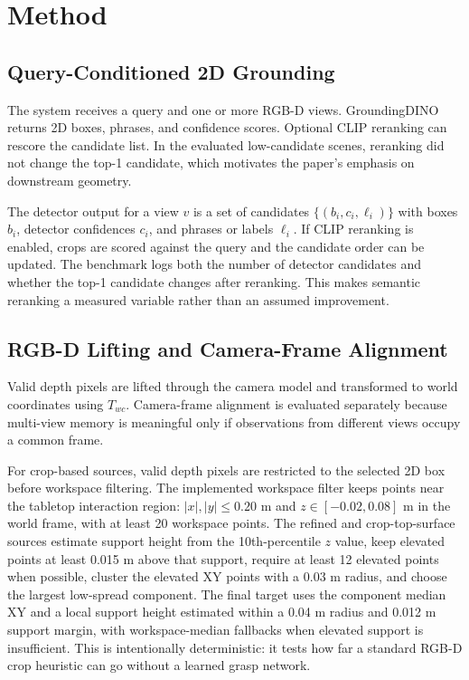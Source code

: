 \documentclass[preprint,12pt]{elsarticle}
\begin{document}
\section{Method}

\subsection{Query-Conditioned 2D Grounding}

The system receives a query and one or more RGB-D views. GroundingDINO returns
2D boxes, phrases, and confidence scores. Optional CLIP reranking can rescore
the candidate list. In the evaluated low-candidate scenes, reranking did not
change the top-1 candidate, which motivates the paper's emphasis on downstream
geometry.

The detector output for a view $v$ is a set of candidates
$\{(b_i, c_i, \ell_i)\}$ with boxes $b_i$, detector confidences $c_i$, and
phrases or labels $\ell_i$. If CLIP reranking is enabled, crops are scored
against the query and the candidate order can be updated. The benchmark logs
both the number of detector candidates and whether the top-1 candidate changes
after reranking. This makes semantic reranking a measured variable rather than
an assumed improvement.

\subsection{RGB-D Lifting and Camera-Frame Alignment}

Valid depth pixels are lifted through the camera model and transformed to world
coordinates using $T_{wc}$. Camera-frame alignment is evaluated separately
because multi-view memory is meaningful only if observations from different
views occupy a common frame.

For crop-based sources, valid depth pixels are restricted to the selected 2D
box before workspace filtering. The implemented workspace filter keeps points
near the tabletop interaction region: $|x|, |y| \leq 0.20$ m and
$z \in [-0.02, 0.08]$ m in the world frame, with at least 20 workspace points.
The refined and crop-top-surface sources estimate support height from the
10th-percentile $z$ value, keep elevated points at least 0.015 m above that
support, require at least 12 elevated points when possible, cluster the
elevated XY points with a 0.03 m radius, and choose the largest low-spread
component. The final target uses the component median XY and a local support
height estimated within a 0.04 m radius and 0.012 m support margin, with
workspace-median fallbacks when elevated support is insufficient. This is
intentionally deterministic: it tests how far a standard RGB-D crop heuristic
can go without a learned grasp network.
\end{document}
